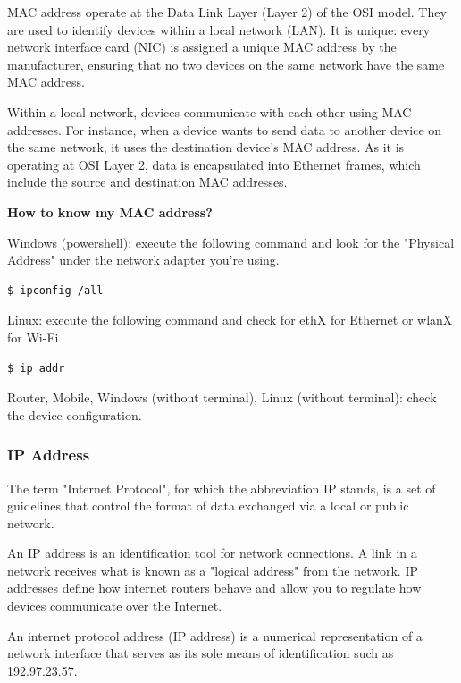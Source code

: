 \documentclass{article}
\newenvironment{codetemplate}[1][]{%
  \mybasecolorbox[#1]
  \itshape
}{%
  \endmybasecolorbox
}
\begin{document}
MAC address  operate at the Data Link Layer (Layer 2) of the OSI model. They are used to identify devices within a local network (LAN). It is unique: every network interface card (NIC) is assigned a unique MAC address by the manufacturer, ensuring that no two devices on the same network have the same MAC address.

Within a local network, devices communicate with each other using MAC addresses. For instance, when a device wants to send data to another device on the same network, it uses the destination device's MAC address. As it is operating at OSI Layer 2, data is encapsulated into Ethernet frames, which include the source and destination MAC addresses.

\textbf{How to know my MAC address?}


Windows (powershell): execute the following command and look for the "Physical Address" under the network adapter you're using. 
\begin{codetemplate}{}
\begin{verbatim}
$ ipconfig /all
\end{verbatim}
\end{codetemplate}

Linux: execute the following command and check for ethX for Ethernet or wlanX for Wi-Fi
\begin{codetemplate}{}
\begin{verbatim}
$ ip addr
\end{verbatim}
\end{codetemplate}

Router, Mobile, Windows (without terminal), Linux (without terminal): check the device configuration.

\subsubsection{IP Address}

The term "Internet Protocol", for which the abbreviation IP stands, is a set of guidelines that control the format of data exchanged via a local or public network.

An IP address is an identification tool for network connections. A link in a network receives what is known as a "logical address" from the network. IP addresses define how internet routers behave and allow you to regulate how devices communicate over the Internet.

An internet protocol address (IP address) is a numerical representation of a network interface that serves as its sole means of identification such as 192.97.23.57.
\end{document}
